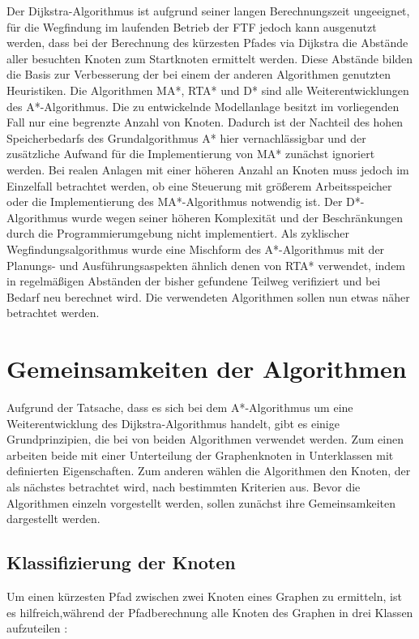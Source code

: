 		Der Dijkstra-Algorithmus ist aufgrund seiner langen Berechnungszeit ungeeignet, für die Wegfindung im laufenden Betrieb der \ac{FTF} jedoch kann ausgenutzt werden, dass bei der Berechnung des kürzesten Pfades via Dijkstra die Abstände aller besuchten Knoten zum Startknoten ermittelt werden. Diese Abstände bilden die Basis zur Verbesserung der bei einem der anderen Algorithmen genutzten Heuristiken. Die Algorithmen \ac{MA*}, \ac{RTA*} und \ac{D*} sind alle Weiterentwicklungen des A*-Algorithmus. Die zu entwickelnde Modellanlage besitzt im vorliegenden Fall nur eine begrenzte Anzahl von Knoten. Dadurch ist der Nachteil des hohen Speicherbedarfs des Grundalgorithmus A* hier vernachlässigbar und der zusätzliche Aufwand für die Implementierung von \ac{MA*} zunächst ignoriert werden. Bei realen Anlagen mit einer höheren Anzahl an Knoten muss jedoch im Einzelfall betrachtet werden, ob eine Steuerung mit größerem Arbeitsspeicher oder die Implementierung des \ac{MA*}-Algorithmus notwendig ist. Der \ac{D*}-Algorithmus wurde wegen seiner höheren Komplexität und der Beschränkungen durch die Programmierumgebung nicht implementiert. Als zyklischer Wegfindungsalgorithmus wurde eine Mischform des A*-Algorithmus mit der Planungs- und Ausführungsaspekten ähnlich denen von \ac{RTA*} verwendet, indem in regelmäßigen Abständen der bisher gefundene Teilweg verifiziert und bei Bedarf neu berechnet wird. Die verwendeten Algorithmen sollen nun etwas näher betrachtet werden.

\section{Gemeinsamkeiten der Algorithmen}

	Aufgrund der Tatsache, dass es sich bei dem A*-Algorithmus um eine Weiterentwicklung des Dijkstra-Algorithmus handelt, gibt es einige Grundprinzipien, die bei von beiden Algorithmen verwendet werden. Zum einen arbeiten beide mit einer Unterteilung der Graphenknoten in Unterklassen mit definierten Eigenschaften. Zum anderen wählen die Algorithmen den Knoten, der als nächstes betrachtet wird, nach bestimmten Kriterien aus. Bevor die Algorithmen einzeln vorgestellt werden, sollen zunächst ihre Gemeinsamkeiten dargestellt werden.
	
	\subsection{Klassifizierung der Knoten}
		\label{Klassifizierung}
		Um einen kürzesten Pfad zwischen zwei Knoten eines Graphen zu ermitteln, ist es hilfreich,während der Pfadberechnung alle Knoten des Graphen in drei Klassen aufzuteilen \cite{DijkstraAlg}:
		
